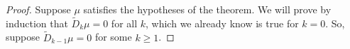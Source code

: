 \documentclass[10pt,a4paper]{amsart}
\begin{document}
\begin{proof}


Suppose $\mu$ satisfies the hypotheses of the theorem. We will prove by induction that $\widetilde{D}_k \mu = 0$ for all $k$, which we already know is true for $k= 0$. So, suppose $\widetilde{D}_{k-1} \mu = 0$ for some $k \geq 1$.


\end{proof}
\end{document}

